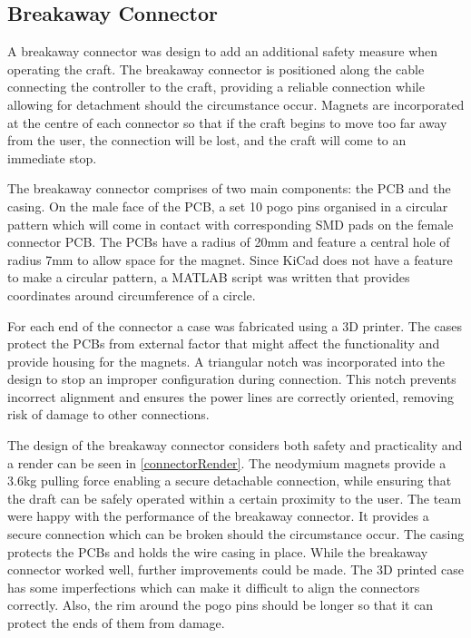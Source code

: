\documentclass [12pt]{article}
\begin{document}
\subsection{Breakaway Connector}

A breakaway connector was design to add an additional safety measure when operating the craft. The breakaway connector is positioned along the cable connecting the controller to the craft, providing a reliable connection while allowing for detachment should the circumstance occur. Magnets are incorporated at the centre of each connector so that if the craft begins to move too far away from the user, the connection will be lost, and the craft will come to an immediate stop. 

The breakaway connector comprises of two main components: the PCB and the casing. On the male face of the PCB, a set 10 pogo pins organised in a circular pattern which will come in contact with corresponding SMD pads on the female connector PCB. The PCBs have a radius of 20mm and feature a central hole of radius 7mm to allow space for the magnet. Since KiCad does not have a feature to make a circular pattern, a MATLAB script was written that provides coordinates around circumference of a circle.

For each end of the connector a case was fabricated using a 3D printer. The cases protect the PCBs from external factor that might affect the functionality and provide housing for the magnets. A triangular notch was incorporated into the design to stop an improper configuration during connection. This notch prevents incorrect alignment and ensures the power lines are correctly oriented, removing risk of damage to other connections.

The design of the breakaway connector considers both safety and practicality and a render can be seen in \ref{connectorRender}. The neodymium magnets provide a 3.6kg pulling force enabling a secure detachable connection, while ensuring that the draft can be safely operated within a certain proximity to the user. 
The team were happy with the performance of the breakaway connector. It provides a secure connection which can be broken should the circumstance occur. The casing protects the PCBs and holds the wire casing in place. While the breakaway connector worked well, further improvements could be made. The 3D printed case has some imperfections which can make it difficult to align the connectors correctly. Also, the rim around the pogo pins should be longer so that it can protect the ends of them from damage.
\end{document}
